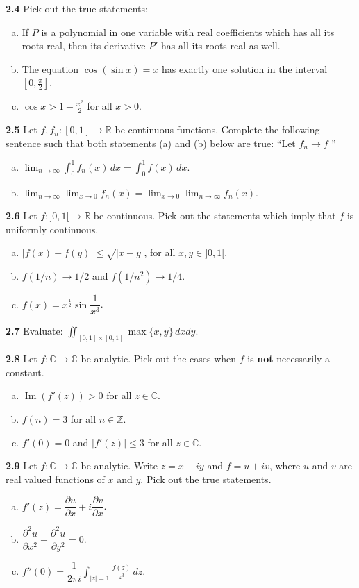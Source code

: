 \documentclass[11pt,a4paper]{article}
\newcommand{\Z}{\mathbb{Z}}
\newcommand{\R}{\mathbb{R}}
\newcommand{\C}{\mathbb{C}}
\newcommand{\ImPart}{\operatorname{Im}}
\newcommand{\qitem}[1]{\par\medskip\noindent\textbf{#1}\hspace{0.5em}}
\begin{document}
\qitem{2.4} Pick out the true statements:
\begin{enumerate}[a.]
  \item If $P$ is a polynomial in one variable with real coefficients which has all its roots real, then its derivative $P'$ has all its roots real as well.
  \item The equation $\cos(\sin x) = x$ has exactly one solution in the interval $\left[0, \frac{\pi}{2}\right]$.
  \item $\cos x > 1 - \frac{x^2}{2}$ for all $x > 0$.
\end{enumerate}

\qitem{2.5} Let $f, f_n : [0, 1] \to \R$ be continuous functions. Complete the following sentence such that both statements (a) and (b) below are true: ``Let $f_n \to f$ \underline{\hspace{2cm}}''
\begin{enumerate}[a.]
  \item $\displaystyle\lim_{n \to \infty} \int_0^1 f_n(x)\,dx = \int_0^1 f(x)\,dx$.
  \item $\displaystyle\lim_{n \to \infty}\lim_{x \to 0} f_n(x) = \lim_{x \to 0}\lim_{n \to \infty} f_n(x)$.
\end{enumerate}

\qitem{2.6} Let $f : ]0, 1[ \to \R$ be continuous. Pick out the statements which imply that $f$ is uniformly continuous.
\begin{enumerate}[a.]
  \item $|f(x) - f(y)| \le \sqrt{|x - y|}$, for all $x, y \in ]0, 1[$.
  \item $f(1/n) \to 1/2$ and $f(1/n^2) \to 1/4$.
  \item $f(x) = x^{\frac{1}{2}} \sin\dfrac{1}{x^3}$.
\end{enumerate}

\qitem{2.7} Evaluate: $\displaystyle\iint_{[0,1]\times[0,1]} \max\{x, y\}\,dxdy$.

\qitem{2.8} Let $f : \C \to \C$ be analytic. Pick out the cases when $f$ is \textbf{not} necessarily a constant.
\begin{enumerate}[a.]
  \item $\ImPart(f'(z)) > 0$ for all $z \in \C$.
  \item $f(n) = 3$ for all $n \in \Z$.
  \item $f'(0) = 0$ and $|f'(z)| \le 3$ for all $z \in \C$.
\end{enumerate}

\qitem{2.9} Let $f : \C \to \C$ be analytic. Write $z = x + iy$ and $f = u + iv$, where $u$ and $v$ are real valued functions of $x$ and $y$. Pick out the true statements.
\begin{enumerate}[a.]
  \item $f'(z) = \dfrac{\partial u}{\partial x} + i\dfrac{\partial v}{\partial x}$.
  \item $\dfrac{\partial^2 u}{\partial x^2} + \dfrac{\partial^2 u}{\partial y^2} = 0$.
  \item $f''(0) = \dfrac{1}{2\pi i}\displaystyle\int_{|z|=1} \frac{f(z)}{z^3}\,dz$.
\end{enumerate}
\end{document}
